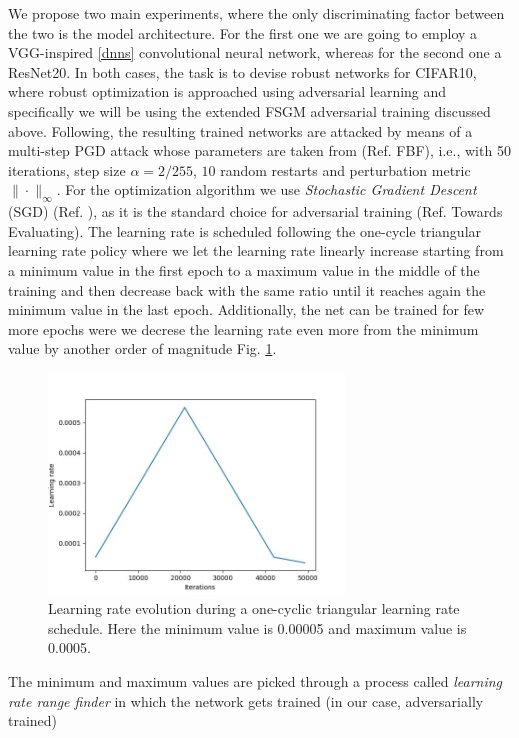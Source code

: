 \documentclass[LaM,binding=0.6cm]{./packages/sapthesis/sapthesis}
\begin{document}
We propose two main experiments, where the only discriminating factor between the 
two is the model architecture. For the first one we are going to employ a VGG-inspired
\ref{dnns} convolutional neural network, whereas for the second one a ResNet20. In
both cases, the task is to devise robust networks for CIFAR10, where robust optimization 
is approached using adversarial learning and specifically we will be using the extended 
FSGM adversarial training discussed above. Following, the resulting trained networks 
are attacked by means of a multi-step PGD attack whose parameters are taken from 
(Ref. FBF), i.e., with 50 iterations, step size $\alpha = 2/255$, $10$ random restarts
and perturbation metric $\| \cdot \|_{\infty}$. For the optimization algorithm we use 
\textit{Stochastic Gradient Descent } (SGD) (Ref. ), as it is the standard choice for 
adversarial training (Ref. Towards Evaluating). The learning rate is scheduled following
the one-cycle triangular learning rate policy where we let the learning rate linearly 
increase starting from a minimum value in the first epoch to a maximum value in the 
middle of the training and then decrease back with the same ratio until it reaches 
again the minimum value in the last epoch. Additionally, the net can be trained for 
few more epochs were we decrese the learning rate even more from the minimum value 
by another order of magnitude Fig. \ref{fig:oclr}.
\begin{figure}[h]
    \centering
    \includegraphics[width=0.7\textwidth]{oclrp}
    \caption{Learning rate evolution during a one-cyclic triangular learning rate schedule.
    Here the minimum value is 0.00005 and maximum value is 0.0005.}
    \label{fig:oclr}
\end{figure}
The minimum and maximum values are picked through a process called \textit{learning 
rate range finder} in which the network gets trained (in our case, adversarially trained)
\end{document}
